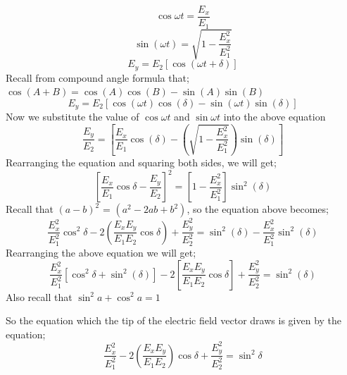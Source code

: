 \begin{equation}
\cos{\omega t} = \frac{E_x}{E_1}
\end{equation}
\begin{equation}
\sin (\omega t) = \sqrt{1-\frac{E_{x}^2}{E_{1}^2}}
\end{equation}
\begin{equation}
E_y = E_2 [\cos(\omega t + \delta)]
\end{equation}
Recall from compound angle formula that; $\cos(A+B) = \cos(A)\cos(B) - \sin(A)\sin(B)$ 
\begin{equation}
E_y = E_2 [\cos(\omega t)\cos(\delta) -\sin(\omega t) \sin(\delta)]
\end{equation}
Now we substitute the value of $\cos{\omega t}$ and $\sin{\omega t}$ into the above equation
\begin{equation}
\frac{E_y}{E_2} =[\frac{E_x}{E_1}\cos(\delta)-(\sqrt{1 - \frac{E_{x}^2}{E_{1}^2}})\sin(\delta)]
\end{equation}
Rearranging the equation and squaring both sides, we will get;
\begin{equation}
{[\frac{E_x}{E_1}\cos{\delta}-\frac{E_y}{E_2}]}^2 = [1-\frac{E_{x}^2}{E_{1}^2}]\sin^2(\delta)
\end{equation}
Recall that ${(a-b)}^2$ = $(a^2-2ab+b^2)$, so the equation above becomes;
\begin{dmath}
\frac{E_{x}^2}{E_{1}^2}\cos^2{\delta}-2(\frac{E_{x}E_{y}}{E_{1}E_{2}}\cos{\delta}) + \frac{E_{y}^2}{E_{2}^2} = \sin^2(\delta)-\frac{E_{x}^2}{E_{1}^2}\sin^2(\delta)
\end{dmath}
Rearranging the above equation we will get;
\begin{equation}
\frac{E_{x}^2}{E_{1}^2}[\cos^2{\delta} + \sin ^2(\delta)] - 2[\frac{E_{x}E_{y}}{E_{1}E_{2}}\cos{\delta}] + \frac{E_{y}^2}{E_{2}^2} = \sin^2(\delta)
\end{equation}
Also recall that $ \sin^2{a} + \cos^2{a} =  1$

So the equation which the tip of the electric field vector draws is given by the equation;
\begin{equation}
\frac{E_{x}^2}{E_{1}^2} -2(\frac{E_{x}E_{y}}{E_{1}E_{2}})\cos\delta + \frac{E_{y}^2}{E_{2}^2} =\sin^2 \delta
\label{locus of electric field vector}
\end{equation}

